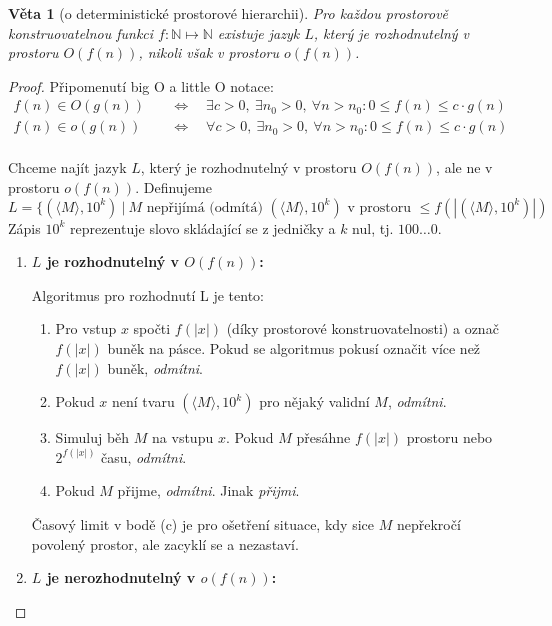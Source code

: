 \documentclass[11pt]{report} %
\newcommand{\N}{\mathbb{N}}
\newtheorem{theorem}{Věta}[section]
\begin{document}
\begin{theorem}[o deterministické prostorové hierarchii]
Pro každou prostorově konstruovatelnou funkci $f : \N \mapsto \N$ existuje jazyk $L$, který je rozhodnutelný v prostoru $O(f(n))$, nikoli však v prostoru $o(f(n))$.
\end{theorem}

\begin{proof}
	Připomenutí big O a little O notace:
	\begin{align*}
		f(n) \in O(g(n)) \quad &\Leftrightarrow \quad \exists c > 0,\ \exists n_0 > 0,\ \forall n>n_0 : 0 \leq f(n) \leq c\cdot g(n) \\
		f(n) \in o(g(n)) \quad &\Leftrightarrow \quad \forall c > 0,\ \exists n_0 > 0,\ \forall n>n_0 : 0 \leq f(n) \leq c\cdot g(n) \\
	\end{align*}
	
	Chceme najít jazyk $L$, který je rozhodnutelný v prostoru $O(f(n))$, ale ne v prostoru $o(f(n))$. Definujeme 
	$$L = \{(\langle M \rangle, 10^k)\ |\ M \text{ nepřijímá (odmítá) } (\langle M \rangle, 10^k) \text{ v prostoru }\leq f(|(\langle M \rangle, 10^k)|) $$
	Zápis $10^k$ reprezentuje slovo skládající se z jedničky a $k$ nul, tj. $100\dots0$.
	
	\begin{enumerate}
		\item \textbf{$L$ je rozhodnutelný v $O(f(n))$:}
		
		Algoritmus pro rozhodnutí L je tento:
		\begin{enumerate}
			\leftskip 20pt
			\setlength{\itemsep}{0pt}
			\item Pro vstup $x$ spočti $f(|x|)$ (díky prostorové konstruovatelnosti) a označ $f(|x|)$ buněk na pásce. Pokud se algoritmus pokusí označit více než $f(|x|)$ buněk, \textit{odmítni}.
			\item Pokud $x$ není tvaru $(\langle M \rangle, 10^k)$ pro nějaký validní $M$, \textit{odmítni}.
			\item Simuluj běh $M$ na vstupu $x$. Pokud $M$ přesáhne $f(|x|)$ prostoru nebo $2^{f(|x|)}$ času, \textit{odmítni}.
			\item Pokud $M$ přijme, \textit{odmítni}. Jinak \textit{přijmi}.
		\end{enumerate}
		Časový limit v bodě (c) je pro ošetření situace, kdy sice $M$ nepřekročí povolený prostor, ale zacyklí se a nezastaví.
		
		\item \textbf{$L$ je nerozhodnutelný v $o(f(n))$:}
		

\end{enumerate}
\end{proof}
\end{document}
